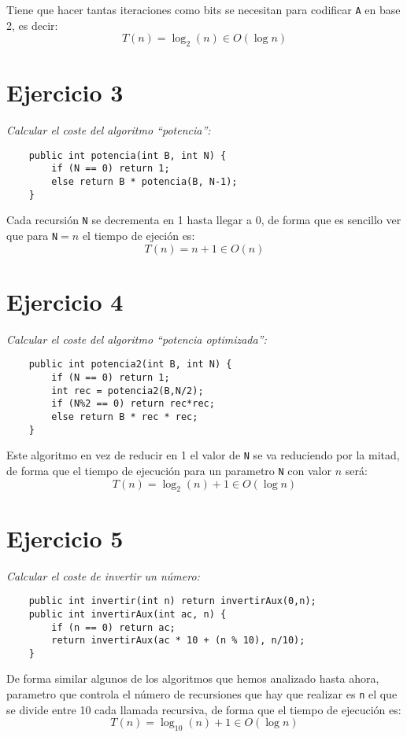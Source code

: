 \documentclass[a4paper, 12pt]{article}
\begin{document}
        Tiene que hacer tantas iteraciones como bits se necesitan para codificar 
        \texttt{A} en base 2, es decir:
        \[
            T(n) = \log_2(n) \in O(\log n)  
        \]

    \section{Ejercicio 3}

        \textit{Calcular el coste del algoritmo ``potencia'':}

        \begin{verbatim}
    public int potencia(int B, int N) {
        if (N == 0) return 1;
        else return B * potencia(B, N-1);
    }
        \end{verbatim}

        Cada recursión \texttt{N} se decrementa en 1 hasta llegar a 0, de forma 
        que es sencillo ver que para \texttt{N}$=n$ el tiempo de ejeción es:
        \[
            T(n) = n + 1 \in O(n)  
        \]

    \section{Ejercicio 4}

        \textit{Calcular el coste del algoritmo ``potencia optimizada'':}

        \begin{verbatim}
    public int potencia2(int B, int N) {
        if (N == 0) return 1;
        int rec = potencia2(B,N/2);
        if (N%2 == 0) return rec*rec;
        else return B * rec * rec;
    }
        \end{verbatim}

        Este algoritmo en vez de reducir en 1 el valor de \texttt{N} se va 
        reduciendo por la mitad, de forma que el tiempo de ejecución para un 
        parametro \texttt{N} con valor $n$ será:
        \[
            T(n) = \log_2(n) + 1 \in O(\log n)
        \]

    \section{Ejercicio 5}

        \textit{Calcular el coste de invertir un número:}

        \begin{verbatim}
    public int invertir(int n) return invertirAux(0,n);
    public int invertirAux(int ac, n) {
        if (n == 0) return ac;
        return invertirAux(ac * 10 + (n % 10), n/10);
    }
        \end{verbatim}

        De forma similar algunos de los algoritmos que hemos analizado hasta 
        ahora, parametro que controla el número de recursiones que hay que 
        realizar es \texttt{n} el que se divide entre 10 cada llamada 
        recursiva, de forma que el tiempo de ejecución es:
        \[
            T(n) = \log_{10} (n) + 1 \in O (\log n)
        \]
\end{document}
